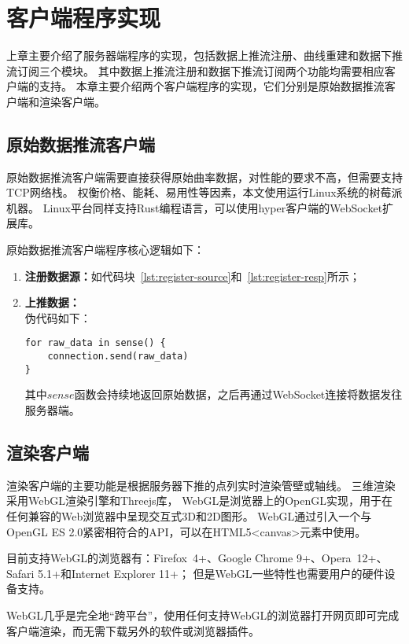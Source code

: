 \cleardoublepage

\section{客户端程序实现}
上章主要介绍了服务器端程序的实现，包括数据上推流注册、曲线重建和数据下推流订阅三个模块。
其中数据上推流注册和数据下推流订阅两个功能均需要相应客户端的支持。
本章主要介绍两个客户端程序的实现，它们分别是原始数据推流客户端和渲染客户端。

\subsection{原始数据推流客户端}
原始数据推流客户端需要直接获得原始曲率数据，对性能的要求不高，但需要支持TCP网络栈。
权衡价格、能耗、易用性等因素，本文使用运行Linux系统的树莓派机器。
Linux平台同样支持Rust编程语言，可以使用hyper客户端的WebSocket扩展库。

原始数据推流客户端程序核心逻辑如下：

\begin{enumerate}
\item \textbf{注册数据源：}如代码块~\ref{lst:register-source}和~\ref{lst:register-resp}所示；
\item \textbf{上推数据：} \\
伪代码如下：

\begin{lstlisting}[caption={上推数据}]
for raw_data in sense() {
    connection.send(raw_data)
}
\end{lstlisting}

其中$sense$函数会持续地返回原始数据，之后再通过WebSocket连接将数据发往服务器端。

\end{enumerate}

\subsection{渲染客户端}

渲染客户端的主要功能是根据服务器下推的点列实时渲染管壁或轴线。
三维渲染采用WebGL渲染引擎和Threejs库，
WebGL是浏览器上的OpenGL实现，用于在任何兼容的Web浏览器中呈现交互式3D和2D图形\cite{webgl}。
WebGL通过引入一个与OpenGL ES 2.0紧密相符合的API，可以在HTML5<canvas>元素中使用。

目前支持WebGL的浏览器有：Firefox 4+、Google Chrome 9+、Opera 12+、Safari 5.1+和Internet Explorer 11+；
但是WebGL一些特性也需要用户的硬件设备支持。

WebGL几乎是完全地“跨平台”，使用任何支持WebGL的浏览器打开网页即可完成客户端渲染，而无需下载另外的软件或浏览器插件。

